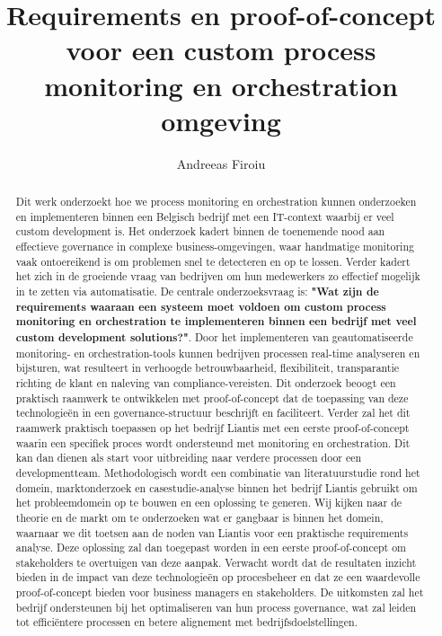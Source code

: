 \documentclass{hogent-article}
\title{Requirements en proof-of-concept voor een custom process monitoring en orchestration omgeving}
\author{Andreeas Firoiu}
\begin{document}
\begin{abstract}
  Dit werk onderzoekt hoe we process monitoring en orchestration kunnen onderzoeken en implementeren binnen een Belgisch bedrijf met een IT-context waarbij er veel custom development is. Het onderzoek kadert binnen de toenemende nood aan effectieve governance in complexe business-omgevingen, waar handmatige monitoring vaak ontoereikend is om problemen snel te detecteren en op te lossen. Verder kadert het zich in de groeiende vraag van bedrijven om hun medewerkers zo effectief mogelijk in te zetten via automatisatie. De centrale onderzoeksvraag is: \textbf{"Wat zijn de requirements waaraan een systeem moet voldoen om custom process monitoring en orchestration te implementeren binnen een bedrijf met veel custom development solutions?"}. Door het implementeren van geautomatiseerde monitoring- en orchestration-tools kunnen bedrijven processen real-time analyseren en bijsturen, wat resulteert in verhoogde betrouwbaarheid, flexibiliteit, transparantie richting de klant en naleving van compliance-vereisten. Dit onderzoek beoogt een praktisch raamwerk te ontwikkelen met proof-of-concept dat de toepassing van deze technologieën in een governance-structuur beschrijft en faciliteert. Verder zal het dit raamwerk praktisch toepassen op het bedrijf Liantis met een eerste proof-of-concept waarin een specifiek proces wordt ondersteund met monitoring en orchestration. Dit kan dan dienen als start voor uitbreiding naar verdere processen door een developmentteam. Methodologisch wordt een combinatie van literatuurstudie rond het domein, marktonderzoek en casestudie-analyse binnen het bedrijf Liantis gebruikt om het probleemdomein op te bouwen en een oplossing te generen. Wij kijken naar de theorie en de markt om te onderzoeken wat er gangbaar is binnen het domein, waarnaar we dit toetsen aan de noden van Liantis voor een praktische requirements analyse. Deze oplossing zal dan toegepast worden in een eerste proof-of-concept om stakeholders te overtuigen van deze aanpak. Verwacht wordt dat de resultaten inzicht bieden in de impact van deze technologieën op procesbeheer en dat ze een waardevolle proof-of-concept bieden voor business managers en stakeholders. De uitkomsten zal het bedrijf ondersteunen bij het optimaliseren van hun process governance, wat zal leiden tot efficiëntere processen en betere alignement met bedrijfsdoelstellingen.
\end{abstract}

\tableofcontents



\printbibliography[heading=bibintoc]
\end{document}

